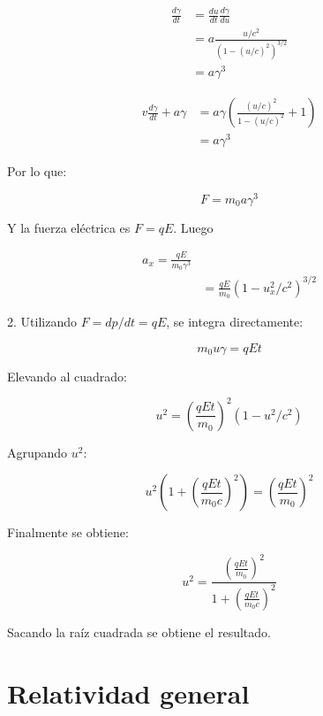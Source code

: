 \documentclass[12pt]{article}
\begin{document}
\begin{align}
\frac{d\gamma}{dt} &= \frac{du}{dt} \frac{d\gamma}{du}\\
 &= a \frac{u/c^2}{(1-(u/c)^2)^{3/2}} \\
 &=a \gamma^3
\end{align}


\begin{align}
v\frac{d\gamma}{dt}+ a \gamma &= a \gamma\left(  \frac{(u/c)^2}{1-(u/c)^2}+1\right)\\
&= a\gamma^{3}
\end{align}

Por lo que:

\begin{equation}
F = m_0 a \gamma^3
\end{equation}

Y la fuerza eléctrica es $F = q E$. Luego

\begin{align}
a_x = \frac{q E}{m_0 \gamma^3} \\
&=\frac{q E}{m_0} (1-u_x^2/c^2)^{3/2}
\end{align}


2. Utilizando $F = dp/dt = q E$, se integra directamente:

\begin{equation}
m_0 u \gamma = qEt  
\end{equation}

Elevando al cuadrado:


\begin{equation}
 u^2  = \left(\frac{qEt}{m_0}\right)^2 (1-u^2/c^2)
\end{equation}

Agrupando $u^2$:

\begin{equation}
u^2\left(  1 + \left(\frac{qEt}{m_0 c}\right)^2\right)  = \left(\frac{qEt}{m_0}\right)^2 
\end{equation}

Finalmente se obtiene:

\begin{equation}
u^2  = \frac{\left(\frac{qEt}{m_0}\right)^2}{  1 + \left(\frac{qEt}{m_0 c}\right)^2} 
\end{equation}

Sacando la raíz cuadrada se obtiene el resultado.


\section{Relatividad general}
\end{document}
